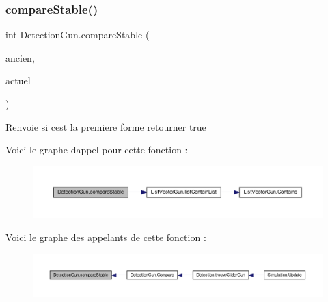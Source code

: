 \subsubsection{\texorpdfstring{compare\+Stable()}{compareStable()}}
{\footnotesize\ttfamily int Detection\+Gun.\+compare\+Stable (\begin{DoxyParamCaption}\item[{List$<$ \mbox{\hyperlink{class_list_vector_gun}{List\+Vector\+Gun}} $>$}]{ancien,  }\item[{List$<$ \mbox{\hyperlink{class_list_vector_gun}{List\+Vector\+Gun}} $>$}]{actuel }\end{DoxyParamCaption})\hspace{0.3cm}{\ttfamily [inline]}}



\begin{DoxyReturn}{Renvoie}
si c\textquotesingle{}est la premiere forme retourner true 
\end{DoxyReturn}


Voici le graphe d\textquotesingle{}appel pour cette fonction \+:
\nopagebreak
\begin{figure}[H]
\begin{center}
\leavevmode
\includegraphics[width=350pt]{class_detection_gun_af0283c67f8fe041c2ff8ded541054d56_cgraph}
\end{center}
\end{figure}
Voici le graphe des appelants de cette fonction \+:
\nopagebreak
\begin{figure}[H]
\begin{center}
\leavevmode
\includegraphics[width=350pt]{class_detection_gun_af0283c67f8fe041c2ff8ded541054d56_icgraph}
\end{center}
\end{figure}
\mbox{\label{class_detection_gun_acac3e59304ebc04b56925511108ecae2}} 
